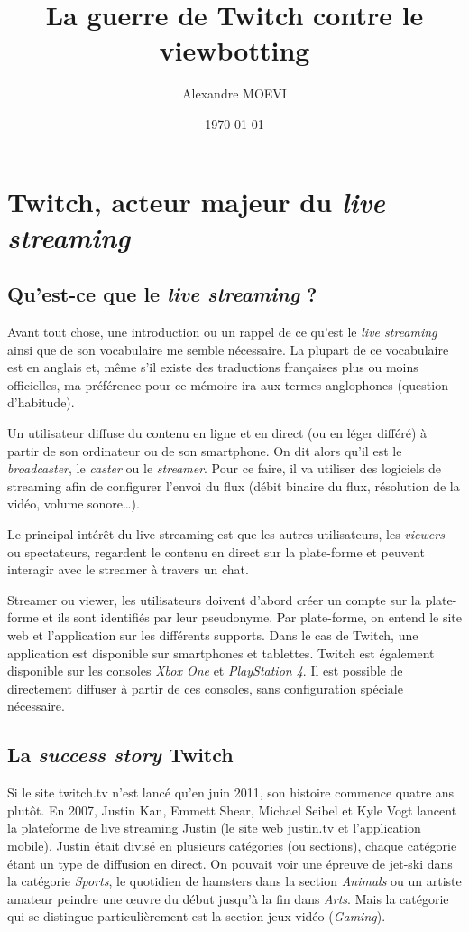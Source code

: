 \documentclass[a4paper]{article}
\title{La guerre de Twitch contre le viewbotting}
\author{Alexandre MOEVI}
\date{\today}
\begin{document}
\maketitle

\section{Twitch, acteur majeur du \textit{live streaming}}
\subsection{Qu'est-ce que le \textit{live streaming} ?}
Avant tout chose, une introduction ou un rappel de ce qu'est le \textit{live streaming} ainsi que de son vocabulaire me semble nécessaire. La plupart de ce vocabulaire est en anglais et, même s'il existe des traductions françaises plus ou moins officielles, ma préférence pour ce mémoire ira aux termes anglophones (question d'habitude).

Un utilisateur diffuse du contenu en ligne et en direct (ou en léger différé) à partir de son ordinateur ou de son smartphone. On dit alors qu'il est le \textit{broadcaster}, le \textit{caster} ou le \textit{streamer}. Pour ce faire, il va utiliser des logiciels de streaming afin de configurer l'envoi du flux (débit binaire du flux, résolution de la vidéo, volume sonore\ldots).

Le principal intérêt du live streaming est que les autres utilisateurs, les \textit{viewers} ou spectateurs, regardent le contenu en direct sur la plate-forme et peuvent interagir avec le streamer à travers un chat. 

Streamer ou viewer, les utilisateurs doivent d'abord créer un compte sur la plate-forme et ils sont identifiés par leur pseudonyme. Par plate-forme, on entend le site web et l'application sur les différents supports. Dans le cas de Twitch, une application est disponible sur smartphones et tablettes. Twitch est également disponible sur les consoles \textit{Xbox One} et \textit{PlayStation 4}. Il est possible de directement diffuser à partir de ces consoles, sans configuration spéciale nécessaire.

\subsection{La \textit{success story} Twitch}
Si le site twitch.tv n'est lancé qu'en juin 2011, son histoire commence quatre ans plutôt. En 2007, Justin Kan, Emmett Shear, Michael Seibel et Kyle Vogt lancent la plateforme de live streaming Justin (le site web justin.tv et l'application mobile). Justin était divisé en plusieurs catégories (ou sections), chaque catégorie étant un type de diffusion en direct. On pouvait voir une épreuve de jet-ski dans la catégorie \textit{Sports}, le quotidien de hamsters dans la section \textit{Animals} ou un artiste amateur peindre une œuvre du début jusqu'à la fin dans \textit{Arts}. Mais la catégorie qui se distingue particulièrement est la section jeux vidéo (\textit{Gaming}).
\end{document}
